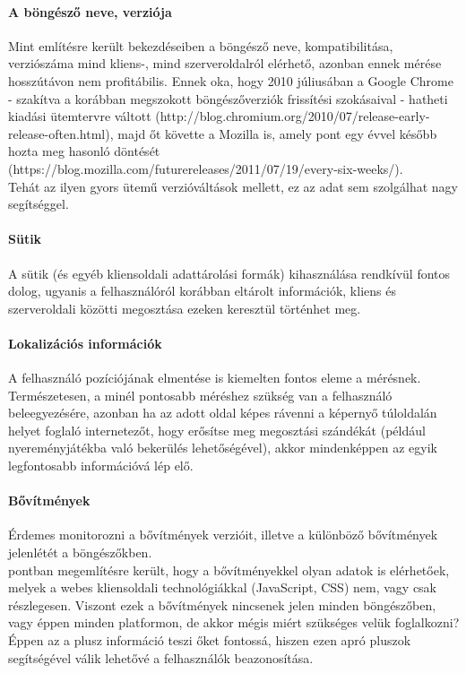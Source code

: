 \paragraph{A böngésző neve, verziója} %
\label{par:a_böngésző_neve_verziója}
Mint említésre került  bekezdéseiben a böngésző neve, kompatibilitása, verziószáma mind kliens-, mind szerveroldalról elérhető, azonban ennek mérése hosszútávon nem profitábilis. Ennek oka, hogy 2010 júliusában a Google Chrome - szakítva a korábban megszokott böngészőverziók frissítési szokásaival - hatheti kiadási ütemtervre váltott (http://blog.chromium.org/2010/07/release-early-release-often.html), majd őt követte a Mozilla is, amely pont egy évvel később hozta meg hasonló döntését (https://blog.mozilla.com/futurereleases/2011/07/19/every-six-weeks/).\hfill\\
Tehát az ilyen gyors ütemű verzióváltások mellett, ez az adat sem szolgálhat nagy segítséggel.

\paragraph{Sütik} %
\label{par:sütik}
A sütik (és egyéb kliensoldali adattárolási formák) kihasználása rendkívül fontos dolog, ugyanis a felhasználóról korábban eltárolt információk, kliens és szerveroldali közötti megosztása ezeken keresztül történhet meg.

\paragraph{Lokalizációs információk} %
\label{par:lokalizációs_információk}
A felhasználó pozíciójának elmentése is kiemelten fontos eleme a mérésnek. Természetesen, a minél pontosabb méréshez szükség van a felhasználó beleegyezésére, azonban ha az adott oldal képes rávenni a képernyő túloldalán helyet foglaló internetezőt, hogy erősítse meg megosztási szándékát (például nyereményjátékba való bekerülés lehetőségével), akkor mindenképpen az egyik legfontosabb információvá lép elő.

\paragraph{Bővítmények} %
\label{par:bővítmények}
Érdemes monitorozni a bővítmények verzióit, illetve a különböző bővítmények jelenlétét a böngészőkben.\hfill\\
 pontban megemlítésre került, hogy a bővítményekkel olyan adatok is elérhetőek, melyek a webes kliensoldali technológiákkal (JavaScript, CSS) nem, vagy csak részlegesen. Viszont ezek a bővítmények nincsenek jelen minden böngészőben, vagy éppen minden platformon, de akkor mégis miért szükséges velük foglalkozni?\hfill\\
Éppen az a plusz információ teszi őket fontossá, hiszen ezen apró pluszok segítségével válik lehetővé a felhasználók beazonosítása.

